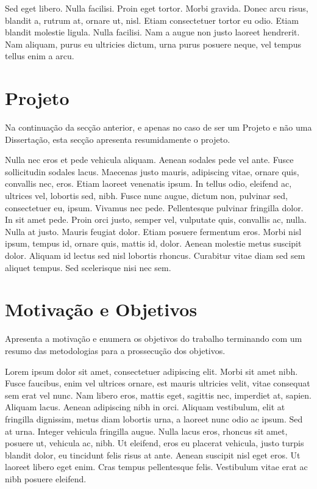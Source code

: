 Sed eget libero. Nulla facilisi. Proin eget tortor. Morbi
gravida. Donec arcu risus, blandit a, rutrum at, ornare ut,
nisl. Etiam consectetuer tortor eu odio. Etiam blandit molestie
ligula. Nulla facilisi. Nam a augue non justo laoreet hendrerit. Nam
aliquam, purus eu ultricies dictum, urna purus posuere neque, vel
tempus tellus enim a arcu. 

\section{Projeto} \label{sec:proj}

Na continuação da secção anterior, e apenas no caso de ser um Projeto
e não uma Dissertação, esta secção apresenta resumidamente o projeto.

Nulla nec eros et pede vehicula aliquam. Aenean sodales pede vel
ante. Fusce sollicitudin sodales lacus. Maecenas justo mauris,
adipiscing vitae, ornare quis, convallis nec, eros. Etiam laoreet
venenatis ipsum. In tellus odio, eleifend ac, ultrices vel, lobortis
sed, nibh. Fusce nunc augue, dictum non, pulvinar sed, consectetuer
eu, ipsum. Vivamus nec pede. Pellentesque pulvinar fringilla dolor. In
sit amet pede. Proin orci justo, semper vel, vulputate quis, convallis
ac, nulla. Nulla at justo. Mauris feugiat dolor. Etiam posuere
fermentum eros. Morbi nisl ipsum, tempus id, ornare quis, mattis id,
dolor. Aenean molestie metus suscipit dolor. Aliquam id lectus sed
nisl lobortis rhoncus. Curabitur vitae diam sed sem aliquet
tempus. Sed scelerisque nisi nec sem. 

\section{Motivação e Objetivos} \label{sec:goals}

Apresenta a motivação e enumera os objetivos do trabalho terminando
com um resumo das metodologias para a prossecução dos objetivos.

Lorem ipsum dolor sit amet, consectetuer adipiscing elit. Morbi sit
amet nibh. Fusce faucibus, enim vel ultrices ornare, est mauris
ultricies velit, vitae consequat sem erat vel nunc. Nam libero eros,
mattis eget, sagittis nec, imperdiet at, sapien. Aliquam lacus. Aenean
adipiscing nibh in orci. Aliquam vestibulum, elit at fringilla
dignissim, metus diam lobortis urna, a laoreet nunc odio ac ipsum. Sed
at urna. Integer vehicula fringilla augue. Nulla lacus eros, rhoncus
sit amet, posuere ut, vehicula ac, nibh. Ut eleifend, eros eu placerat
vehicula, justo turpis blandit dolor, eu tincidunt felis risus at
ante. Aenean suscipit nisl eget eros. Ut laoreet libero eget
enim. Cras tempus pellentesque felis. Vestibulum vitae erat ac nibh
posuere eleifend. 

